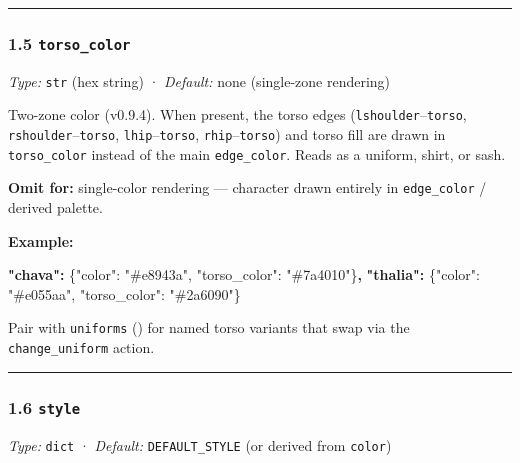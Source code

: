 \documentclass[
  12pt,
  letterpaper,
]{book}
\newenvironment{Shaded}{}{}
\newcommand{\DataTypeTok}[1]{\textcolor[rgb]{0.56,0.13,0.00}{#1}}
\newcommand{\ErrorTok}[1]{\textcolor[rgb]{1.00,0.00,0.00}{\textbf{#1}}}
\newcommand{\FunctionTok}[1]{\textcolor[rgb]{0.02,0.16,0.49}{#1}}
\newcommand{\StringTok}[1]{\textcolor[rgb]{0.25,0.44,0.63}{#1}}
\begin{document}
\begin{center}\rule{0.5\linewidth}{0.5pt}\end{center}

\subsubsection{\texorpdfstring{1.5
\texttt{torso\_color}}{1.5 torso\_color}}\label{torso_color}

\emph{Type:} \texttt{str} (hex string) · \emph{Default:} none
(single-zone rendering)

Two-zone color (v0.9.4). When present, the torso edges
(\texttt{lshoulder}--\texttt{torso}, \texttt{rshoulder}--\texttt{torso},
\texttt{lhip}--\texttt{torso}, \texttt{rhip}--\texttt{torso}) and torso
fill are drawn in \texttt{torso\_color} instead of the main
\texttt{edge\_color}. Reads as a uniform, shirt, or sash.

\textbf{Omit for:} single-color rendering --- character drawn entirely
in \texttt{edge\_color} / derived palette.

\textbf{Example:}

\begin{Shaded}
\begin{Highlighting}[]
\ErrorTok{"chava":}  \FunctionTok{\{}\DataTypeTok{"color"}\FunctionTok{:} \StringTok{"\#e8943a"}\FunctionTok{,} \DataTypeTok{"torso\_color"}\FunctionTok{:} \StringTok{"\#7a4010"}\FunctionTok{\}}\ErrorTok{,}
\ErrorTok{"thalia":} \FunctionTok{\{}\DataTypeTok{"color"}\FunctionTok{:} \StringTok{"\#e055aa"}\FunctionTok{,} \DataTypeTok{"torso\_color"}\FunctionTok{:} \StringTok{"\#2a6090"}\FunctionTok{\}}
\end{Highlighting}
\end{Shaded}

Pair with \texttt{uniforms} (\cite{uniforms}) for named
torso variants that swap via the \texttt{change\_uniform} action.

\begin{center}\rule{0.5\linewidth}{0.5pt}\end{center}

\subsubsection{\texorpdfstring{1.6
\texttt{style}}{1.6 style}}\label{style}

\emph{Type:} \texttt{dict} · \emph{Default:} \texttt{DEFAULT\_STYLE} (or
derived from \texttt{color})
\end{document}
